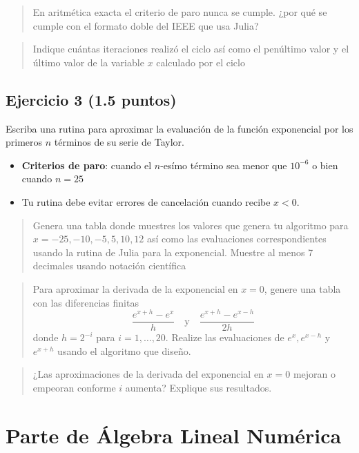 \documentclass[11pt]{article}
\providecommand{\tightlist}{%
      \setlength{\itemsep}{0pt}\setlength{\parskip}{0pt}}
\begin{document}
    \begin{quote}
 En aritmética exacta el criterio de paro nunca se cumple. ¿por qué se
cumple con el formato doble del IEEE que usa Julia?
\end{quote}

    \begin{quote}
Indique cuántas iteraciones realizó el ciclo así como el penúltimo valor
y el último valor de la variable \(x\) calculado por el ciclo
\end{quote}

    \subsection{Ejercicio 3 (1.5 puntos)}\label{ejercicio-3}

 Escriba una rutina para aproximar la evaluación de la función
exponencial por los primeros \(n\) términos de su serie de Taylor. 

    \begin{itemize}
\tightlist
\item
   \textbf{Criterios de paro}: cuando el \(n\)-esímo término sea menor
  que \(10^{-6}\) o bien cuando \(n=25\)
\item
   Tu rutina debe evitar errores de cancelación cuando recibe \(x<0\).
\end{itemize}

    \begin{quote}
 Genera una tabla donde muestres los valores que genera tu algoritmo
para \(x=-25,-10,-5,5,10,12\) así como las evaluaciones correspondientes
usando la rutina de Julia para la exponencial. Muestre al menos 7
decimales usando notación científica
\end{quote}

    \begin{quote}
 Para aproximar la derivada de la exponencial en \(x=0\), genere una
tabla con las diferencias finitas
\[\dfrac{e^{x+h}-e^{x}}{h}\quad\text{y}\quad\dfrac{e^{x+h}-e^{x-h}}{2h}\]
donde \(h=2^{-i}\) para \(i=1,\dots,20.\) Realize las evaluaciones de
\(e^{x},e^{x-h}\) y \(e^{x+h}\) usando el algoritmo que diseño.
\end{quote}

    \begin{quote}
 ¿Las aproximaciones de la derivada del exponencial en \(x=0\) mejoran o
empeoran conforme \(i\) aumenta? Explique sus resultados.
\end{quote}

    \section{Parte de Álgebra Lineal
Numérica}\label{parte-de-uxe1lgebra-lineal-numuxe9rica}
\end{document}
